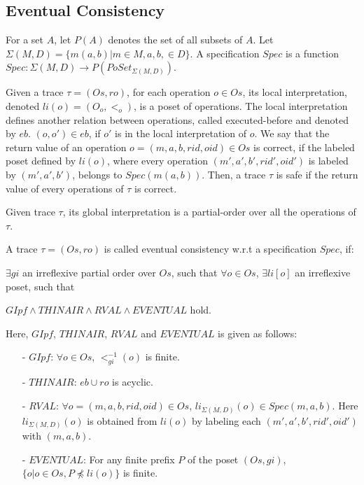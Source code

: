 {\subsection{Eventual Consistency}
\label{subsec:eventual consistency}

For a set $A$, let $P(A)$ denotes the set of all subsets of $A$. Let $\Sigma(M,D) = \{ m(a,b) \vert m \in M, a,b, \in D \}$. A specification $Spec$ is a function $Spec: \Sigma(M,D) \rightarrow P(PoSet_{\Sigma(M,D)})$.

Given a trace $\tau = (Os,ro)$, for each operation $o \in Os$, its local interpretation, denoted $li(o) = (O_o,<_o)$, is a poset of operations. The local interpretation defines another relation between operations, called executed-before and denoted by $eb$. $(o,o') \in eb$, if $o'$ is in the local interpretation of $o$. We say that the return value of an operation $o = (m,a,b,rid,oid) \in Os$ is correct, if the labeled poset defined by $li(o)$, where every operation $(m',a',b',rid',oid')$ is labeled by $(m',a',b')$, belongs to $Spec(m(a,b))$. Then, a trace $\tau$ is safe if the return value of every operations of $\tau$ is correct.

Given trace $\tau$, its global interpretation is a partial-order over all the operations of $\tau$.

\begin{definition}
\label{definition:eventual consistency}
A trace $\tau = (Os,ro)$ is called eventual consistency w.r.t a specification $Spec$, if:

$\exists gi$ an irreflexive partial order over $Os$, such that $\forall o \in Os$, $\exists li[o]$ an irreflexive poset, such that

$\textit{GIpf} \wedge \textit{THINAIR} \wedge \textit{RVAL} \wedge \textit{EVENTUAL}$ hold.
\end{definition}

Here, $GIpf$, $THINAIR$, $RVAL$ and $EVENTUAL$ is given as follows:

\begin{itemize}
\setlength{\itemsep}{0.5pt}
\item[-] $\textit{GIpf}$: $\forall o \in Os$, $<^{-1}_{gi}(o)$ is finite.

\item[-] $\textit{THINAIR}$: $eb \cup ro$ is acyclic.

\item[-] $\textit{RVAL}$: $\forall o = (m,a,b,rid,oid) \in Os$, $li_{\Sigma(M,D)}(o) \in Spec(m,a,b)$. Here $li_{\Sigma(M,D)}(o)$ is obtained from $li(o)$ by labeling each $(m',a',b',rid',oid')$ with $(m,a,b)$.

\item[-] $\textit{EVENTUAL}$: For any finite prefix $P$ of the poset $(Os,gi)$, $\{ o \vert o \in Os, P \npreceq li(o) \}$ is finite.
\end{itemize}
}

